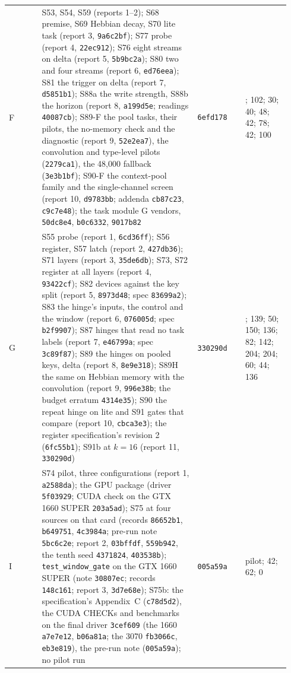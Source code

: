 \documentclass[11pt]{article}
\begin{document}
{\begin{longtable}{@{}>{\raggedright\arraybackslash}p{0.11\linewidth}>{\raggedright\arraybackslash}p{0.52\linewidth}>{\raggedright\arraybackslash}p{0.16\linewidth}>{\raggedright\arraybackslash}p{0.15\linewidth}@{}}
F & S53, S54, S59 (reports 1--2); S68 premise, S69 Hebbian decay, S70 lite task (report 3, \texttt{9a6c2bf}); S77 probe (report 4, \texttt{22ec912}); S76 eight streams on delta (report 5, \texttt{5b9bc2a}); S80 two and four streams (report 6, \texttt{ed76eea}); S81 the trigger on delta (report 7, \texttt{d5851b1}); S88a the write strength, S88b the horizon (report 8, \texttt{a199d5e}; readings \texttt{40087cb}); S89-F the pool tasks, their pilots, the no-memory check and the diagnostic (report 9, \texttt{52e2ea7}), the convolution and type-level pilots (\texttt{2279ca1}), the 48{,}000 fallback (\texttt{3e3b1bf}); S90-F the context-pool family and the single-channel screen (report 10, \texttt{d9783bb}; addenda \texttt{cb87c23}, \texttt{c9c7e48}); the task module G vendors, \texttt{50dc8e4}, \texttt{b0c6332}, \texttt{9017b82} & \texttt{6efd178} & 322; 102; 30; 40; 48; 42; 78; 42; 100\\
G & S55 probe (report 1, \texttt{6cd36ff}); S56 register, S57 latch (report 2, \texttt{427db36}); S71 layers (report 3, \texttt{35de6db}); S73, S72 register at all layers (report 4, \texttt{93422cf}); S82 devices against the key split (report 5, \texttt{8973d48}; spec \texttt{83699a2}); S83 the hinge's inputs, the control and the window (report 6, \texttt{076005d}; spec \texttt{b2f9907}); S87 hinges that read no task labels (report 7, \texttt{e46799a}; spec \texttt{3c89f87}); S89 the hinges on pooled keys, delta (report 8, \texttt{8e9e318}); S89H the same on Hebbian memory with the convolution (report 9, \texttt{996e38b}; the budget erratum \texttt{4314e35}); S90 the repeat hinge on lite and S91 gates that compare (report 10, \texttt{cbca3e3}); the register specification's revision 2 (\texttt{6fc55b1}); S91b at $k = 16$ (report 11, \texttt{330290d}) & \texttt{330290d} & 22; 139; 50; 150; 136; 82; 142; 204; 204; 60; 44; 136\\
I & S74 pilot, three configurations (report 1, \texttt{a2588da}); the GPU package (driver \texttt{5f03929}; CUDA check on the GTX 1660 SUPER \texttt{203a5ad}); S75 at four sources on that card (records \texttt{86652b1}, \texttt{b649751}, \texttt{4c3984a}; pre-run note \texttt{5bc6c2e}; report 2, \texttt{03bffdf}, \texttt{559b942}, the tenth seed \texttt{4371824}, \texttt{403538b}); \texttt{test\_window\_gate} on the GTX 1660 SUPER (note \texttt{30807ec}; records \texttt{148c161}; report 3, \texttt{3d7e68e}); S75b: the specification's Appendix~C (\texttt{c78d5d2}), the CUDA CHECKs and benchmarks on the final driver \texttt{3cef609} (the 1660 \texttt{a7e7e12}, \texttt{b06a81a}; the 3070 \texttt{fb3066c}, \texttt{eb3e819}), the pre-run note (\texttt{005a59a}); no pilot run & \texttt{005a59a} & pilot; 42; 62; 0\\

\end{longtable}}
\end{document}
